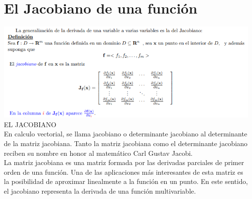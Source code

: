 \documentclass[12pt,a4paper]{article}
\begin{document}
\tableofcontents

\section{El Jacobiano de una función}
\includegraphics[scale=1]{jac fun.PNG} \\
EL JACOBIANO\\
En calculo vectorial, se llama jacobiano o determinante jacobiano al determinante de la matriz jacobiana. Tanto la matriz jacobiana como el determinante jacobiano reciben su nombre en honor al matemático Carl Gustav Jacobi.\\
La matriz jacobiana es una matriz formada por las derivadas parciales de primer orden de una función. Una de las aplicaciones más interesantes de esta matriz es la posibilidad de aproximar linealmente a la función en un punto. En este sentido, el jacobiano representa la derivada de una función multivariable.\\\\
\end{document}
